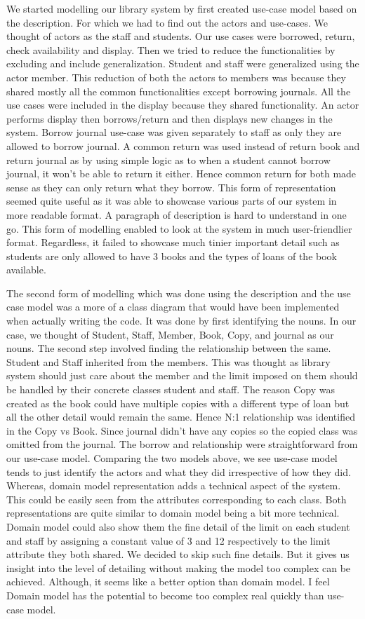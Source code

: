 \documentclass[12pt]{article}
\begin{document}
We started modelling our library system by first created use-case model based on the description. For which we had to find out the actors and use-cases. We thought of actors as the staff and students. Our use cases were borrowed, return, check availability and display. Then we tried to reduce the functionalities by excluding and include generalization. Student and staff were generalized using the actor member. This reduction of both the actors to members was because they shared mostly all the common functionalities except borrowing journals. All the use cases were included in the display because they shared functionality. An actor performs display then borrows/return and then displays new changes in the system. Borrow journal use-case was given separately to staff as only they are allowed to borrow journal. A common return was used instead of return book and return journal as by using simple logic as to when a student cannot borrow journal, it won't be able to return it either. Hence common return for both made sense as they can only return what they borrow. This form of representation seemed quite useful as it was able to showcase various parts of our system in more readable format. A paragraph of description is hard to understand in one go. This form of modelling enabled to look at the system in much user-friendlier format. Regardless, it failed to showcase much tinier important detail such as students are only allowed to have 3 books and the types of loans of the book available.

The second form of modelling which was done using the description and the use case model was a more of a class diagram that would have been implemented when actually writing the code. It was done by first identifying the nouns. In our case, we thought of Student, Staff, Member, Book, Copy, and journal as our nouns. The second step involved finding the relationship between the same. Student and Staff inherited from the members. This was thought as library system should just care about the member and the limit imposed on them should be handled by their concrete classes student and staff. The reason Copy was created as the book could have multiple copies with a different type of loan but all the other detail would remain the same. Hence N:1 relationship was identified in the Copy vs Book. Since journal didn't have any copies so the copied class was omitted from the journal. The borrow and relationship were straightforward from our use-case model. Comparing the two models above, we see use-case model tends to just identify the actors and what they did irrespective of how they did. Whereas, domain model representation adds a technical aspect of the system. This could be easily seen from the attributes corresponding to each class. Both representations are quite similar to domain model being a bit more technical. Domain model could also show them the fine detail of the limit on each student and staff by assigning a constant value of 3 and 12 respectively to the limit attribute they both shared. We decided to skip such fine details. But it gives us insight into the level of detailing without making the model too complex can be achieved. Although, it seems like a better option than domain model. I feel Domain model has the potential to become too complex real quickly than use-case model. 
\end{document}
